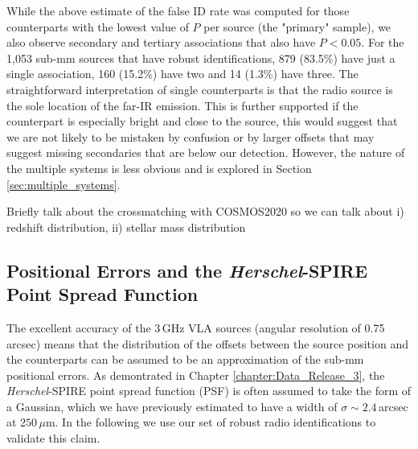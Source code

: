 While the above estimate of the false ID rate was computed for those counterparts with the lowest value of $P$ per source (the "primary" sample), we also observe secondary and tertiary associations that also have $P < 0.05$. For the 1,053 sub-mm sources that have robust identifications, 879 (83.5\%) have just a single association, 160 (15.2\%) have two and 14 (1.3\%) have three. The straightforward interpretation of single counterparts is that the radio source is the sole location of the far-IR emission. This is further supported if the counterpart is especially bright and close to the source, this would suggest that we are not likely to be mistaken by confusion or by larger offsets that may suggest missing secondaries that are below our detection. However, the nature of the multiple systems is less obvious and is explored in Section \ref{sec:multiple_systems}.

{\color{red}Briefly talk about the crossmatching with COSMOS2020 so we can talk about i) redshift distribution, ii) stellar mass distribution}

\subsection{Positional Errors and the \textit{Herschel}-SPIRE Point Spread Function}

The excellent accuracy of the 3\,GHz VLA sources (angular resolution of 0.75\,arcsec) means that the distribution of the offsets between the source position and the counterparts can be assumed to be an approximation of the sub-mm positional errors. As demontrated in Chapter \ref{chapter:Data_Release_3}, the \textit{Herschel}-SPIRE point spread function (PSF) is often assumed to take the form of a Gaussian, which we have previously estimated to have a width of $\sigma \sim 2.4$\,arcsec at $250\,\mu$m. In the following we use our set of robust radio identifications to validate this claim.

